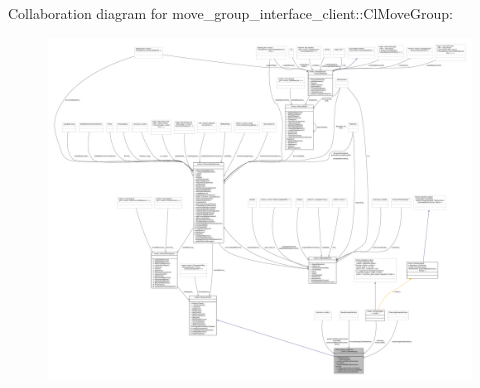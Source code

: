 Collaboration diagram for move\+\_\+group\+\_\+interface\+\_\+client\+:\+:Cl\+Move\+Group\+:
\nopagebreak
\begin{figure}[H]
\begin{center}
\leavevmode
\includegraphics[width=350pt]{classmove__group__interface__client_1_1ClMoveGroup__coll__graph}
\end{center}
\end{figure}
